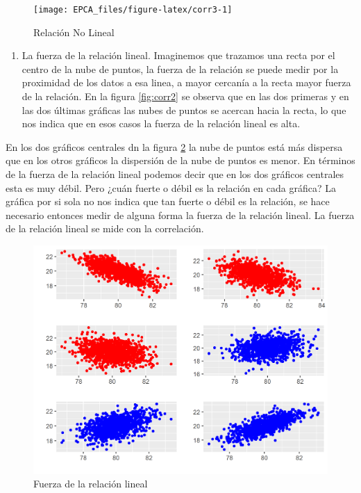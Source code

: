 \documentclass[
]{krantz}
\providecommand{\tightlist}{%
  \setlength{\itemsep}{0pt}\setlength{\parskip}{0pt}}
\begin{document}
\begin{figure}[!h]

{\centering \texttt{[image: EPCA\_files/figure-latex/corr3-1]} 

}

\caption{Relación No Lineal}\label{fig:corr3}
\end{figure}

\begin{enumerate}
\def\labelenumi{\arabic{enumi}.}
\setcounter{enumi}{2}
\tightlist
\item
  La fuerza de la relación lineal. Imaginemos que trazamos una recta por el centro de la nube de puntos, la fuerza de la relación se puede medir por la proximidad de los datos a esa linea, a mayor cercanía a la recta mayor fuerza de la relación. En la figura \ref{fig:corr2} se observa que en las dos primeras y en las dos últimas gráficas las nubes de puntos se acercan hacia la recta, lo que nos indica que en esos casos la fuerza de la relación lineal es alta.
\end{enumerate}

En los dos gráficos centrales dn la figura \ref{fig:corr4} la nube de puntos está más dispersa que en los otros gráficos la dispersión de la nube de puntos es menor. En términos de la fuerza de la relación lineal podemos decir que en los dos gráficos centrales esta es muy débil. Pero ¿cuán fuerte o débil es la relación en cada gráfica? La gráfica por si sola no nos indica que tan fuerte o débil es la relación, se hace necesario entonces medir de alguna forma la fuerza de la relación lineal. La fuerza de la relación lineal se mide con la correlación.

\begin{figure}[!h]

{\centering \includegraphics[width=0.5\linewidth]{corr3} 

}

\caption{Fuerza de la relación lineal}\label{fig:corr4}
\end{figure}
\end{document}
